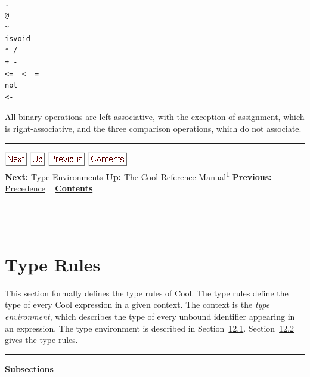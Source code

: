 \documentclass[]{article}
\begin{document}
\begin{verbatim}
.
@
~
isvoid
* /
+ -
<=  <  =
not
<-
\end{verbatim}

All binary operations are left-associative, with the exception of
assignment, which is right-associative, and the three comparison
operations, which do not associate.

\begin{center}\rule{3in}{0.4pt}\end{center}

\href{node42.html}{\includegraphics{next.png}}
\href{cool-manual.html}{\includegraphics{up.png}}
\href{node40.html}{\includegraphics{prev.png}}
\href{node1.html}{\includegraphics{contents.png}} \\ \textbf{Next:}
\href{node42.html}{Type Environments} \textbf{Up:}
\href{cool-manual.html}{The Cool Reference Manual\textsuperscript{1}}
\textbf{Previous:} \href{node40.html}{Precedence} ~
\textbf{\href{node1.html}{Contents}} \\ \\

\section{\\ Type Rules}

This section formally defines the type rules of Cool. The type rules
define the type of every Cool expression in a given context. The context
is the \emph{type environment}, which describes the type of every
unbound identifier appearing in an expression. The type environment is
described in Section~\href{node42.html\#sec-typenv}{12.1}.
Section~\href{node43.html\#sec-typr}{12.2} gives the type rules.

\begin{center}\rule{3in}{0.4pt}\end{center}

\textbf{Subsections}
\end{document}

